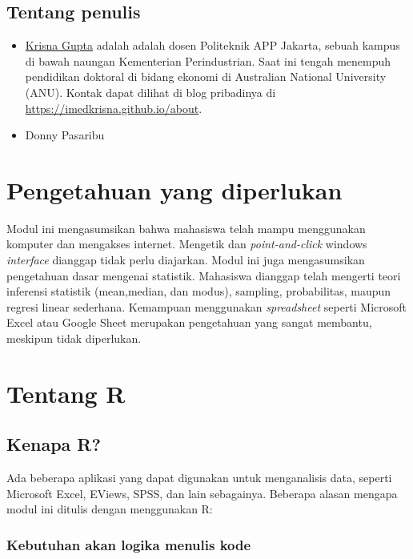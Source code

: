 \documentclass[
]{book}
\begin{document}
\hypertarget{tentang-penulis}{%
\subsection{Tentang penulis}\label{tentang-penulis}}

\begin{itemize}
\item
  \href{https://imedkrisna.github.io/}{Krisna Gupta} adalah adalah dosen Politeknik APP Jakarta, sebuah kampus di bawah naungan Kementerian Perindustrian. Saat ini tengah menempuh pendidikan doktoral di bidang ekonomi di Australian National University (ANU). Kontak dapat dilihat di blog pribadinya di \url{https://imedkrisna.github.io/about}.
\item
  Donny Pasaribu
\end{itemize}

\hypertarget{pengetahuan-yang-diperlukan}{%
\section{Pengetahuan yang diperlukan}\label{pengetahuan-yang-diperlukan}}

Modul ini mengasumsikan bahwa mahasiswa telah mampu menggunakan komputer dan mengakses internet. Mengetik dan \emph{point-and-click} windows \emph{interface} dianggap tidak perlu diajarkan. Modul ini juga mengasumsikan pengetahuan dasar mengenai statistik. Mahasiswa dianggap telah mengerti teori inferensi statistik (mean,median, dan modus), sampling, probabilitas, maupun regresi linear sederhana. Kemampuan menggunakan \emph{spreadsheet} seperti Microsoft Excel atau Google Sheet merupakan pengetahuan yang sangat membantu, meskipun tidak diperlukan.

\hypertarget{tentang-r}{%
\section{Tentang R}\label{tentang-r}}

\hypertarget{kenapa-r}{%
\subsection{Kenapa R?}\label{kenapa-r}}

Ada beberapa aplikasi yang dapat digunakan untuk menganalisis data, seperti Microsoft Excel, EViews, SPSS, dan lain sebagainya. Beberapa alasan mengapa modul ini ditulis dengan menggunakan R:

\hypertarget{kebutuhan-akan-logika-menulis-kode}{%
\subsubsection{Kebutuhan akan logika menulis kode}\label{kebutuhan-akan-logika-menulis-kode}}
\end{document}
